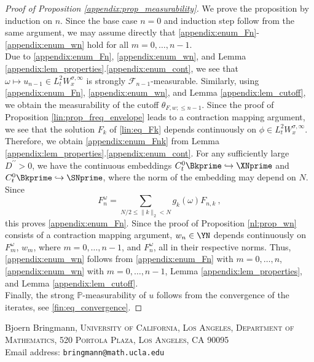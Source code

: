\documentclass[11pt]{article}
\makeatletter
\newcommand{\Addresses}{{%
  \bigskip\bigskip \small

  Bjoern Bringmann, \textsc{University of California, Los Angeles, Department of Mathematics, 520 Portola Plaza, Los Angeles, CA 90095}\\\nopagebreak
  Email address: \texttt{bringmann@math.ucla.edu}

}}
\makeatother
\begin{document}
\begin{proof}[Proof of Proposition \ref{appendix:prop_measurability}]
We prove the proposition by induction on \( n\). Since the base case \( n=0 \) and induction step follow from the same argument, we may assume directly that \ref{appendix:enum_Fn}-\ref{appendix:enum_wn} hold for all \( {m=0,\hdots, n-1} \). \\
Due to \ref{appendix:enum_Fn}, \ref{appendix:enum_wn}, and Lemma \ref{appendix:lem_properties}.\ref{appendix:enum_cont}, we see that \( \omega \mapsto  u_{n-1} \in L_t^2 W_x^{\sigma,\infty} \) is strongly \(\mathscr{F}_{n-1} \)-measurable. Similarly, using \ref{appendix:enum_Fn}, \ref{appendix:enum_wn}, and Lemma \ref{appendix:lem_cutoff}, we obtain the measurability of the cutoff \( \theta_{F,w;\leq n-1} \). Since the proof of  Proposition \ref{lin:prop_freq_envelope} leads to a contraction mapping argument, we see that the solution \( F_k \) of \eqref{lin:eq_Fk} depends continuously on \( \phi \in L_t^2 W_x^{\sigma,\infty} \). Therefore, we obtain \ref{appendix:enum_Fnk} from Lemma \ref{appendix:lem_properties}.\ref{appendix:enum_cont}. For any sufficiently large \( D^{\prime\prime} >0 \), we have the continuous embeddings \( C_t^0 \Bkprime \hookrightarrow \XNprime \) and \( C_t^0 \Bkprime \hookrightarrow \SNprime\), where the norm of the embedding may depend on \( N \). Since \begin{equation*}
F_n^\omega = \sum_{N/2 \leq \| k\|_2 < N} g_k(\omega) F_{n,k}~,
\end{equation*}
this proves \ref{appendix:enum_Fn}.  Since the proof of Proposition \ref{nl:prop_wn} consists of a contraction mapping argument, \( w_n \in \YN \) depends continuously on \( F_m^\omega\), \( w_m \), where \( m=0,\hdots, n-1\), and \( F_n^\omega\), all in their respective norms. Thus, \ref{appendix:enum_wn} follows from \ref{appendix:enum_Fn} with \( m=0,\hdots,n \), \ref{appendix:enum_wn} with \( m=0,\hdots,n-1\),  Lemma \ref{appendix:lem_properties}, and Lemma \ref{appendix:lem_cutoff}. \\
Finally, the strong \( \mathbb{P} \)-measurability of \( u \) follows from the convergence of the iterates, see \eqref{fin:eq_convergence}.
\end{proof}






\Addresses
\end{document}
